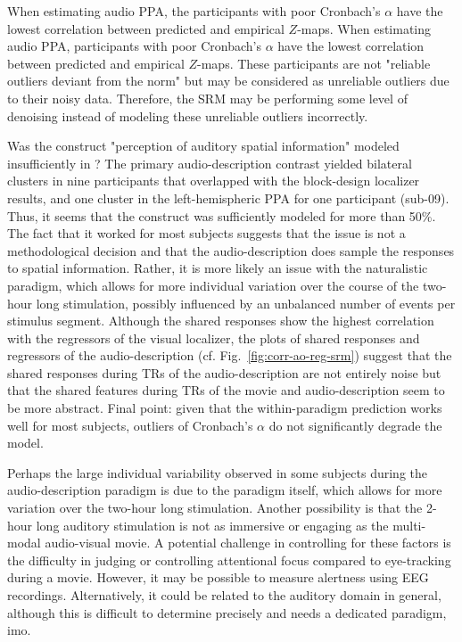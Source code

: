 

%
When estimating audio PPA, the participants with poor Cronbach's $\alpha$ have
the lowest correlation between predicted and empirical $Z$-maps.
%
When estimating audio PPA, participants with poor Cronbach's $\alpha$ have the
lowest correlation between predicted and empirical $Z$-maps.
%
These participants are not "reliable outliers deviant from the norm" but may be
considered as unreliable outliers due to their noisy data.
%
Therefore, the SRM may be performing some level of denoising instead of modeling
these unreliable outliers incorrectly.

%
Was the construct "perception of auditory spatial information" modeled
insufficiently in \citet{haeusler2022processing}?
%
The primary audio-description contrast yielded bilateral clusters in nine
participants that overlapped with the block-design localizer results, and one
cluster in the left-hemispheric PPA for one participant (sub-09). Thus, it seems
that the construct was sufficiently modeled for more than 50\%.
%
The fact that it worked for most subjects suggests that the issue is not a
methodological decision and that the audio-description does sample the responses
to spatial information.
%
Rather, it is more likely an issue with the naturalistic paradigm, which allows
for more individual variation over the course of the two-hour long stimulation,
possibly influenced by an unbalanced number of events per stimulus segment.
%
Although the shared responses show the highest correlation with the regressors
of the visual localizer, the plots of shared responses and regressors of the
audio-description (cf. Fig.~\ref{fig:corr-ao-reg-srm}) suggest that the shared
responses during TRs of the audio-description are not entirely noise but that
the shared features during TRs of the movie and audio-description seem to be
more abstract.
%
Final point: given that the within-paradigm prediction works well for most
subjects, outliers of Cronbach's $\alpha$ do not significantly degrade the
model.

%
Perhaps the large individual variability observed in some subjects during the
audio-description paradigm is due to the paradigm itself, which allows for more
variation over the two-hour long stimulation.
%
Another possibility is that the 2-hour long auditory stimulation is not as
immersive or engaging as the multi-modal audio-visual movie.
%
A potential challenge in controlling for these factors is the difficulty in
judging or controlling attentional focus compared to eye-tracking during a
movie.
%
However, it may be possible to measure alertness using EEG recordings.
%
Alternatively, it could be related to the auditory domain in general, although
this is difficult to determine precisely and needs a dedicated paradigm, imo.


